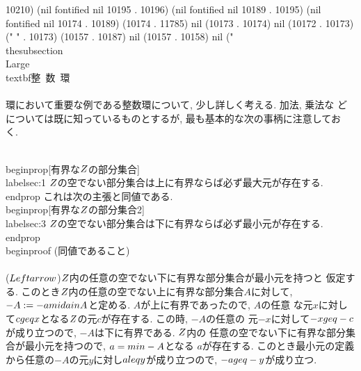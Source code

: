 10210) (nil fontified nil 10195 . 10196) (nil fontified nil 10189 . 10195) (nil fontified nil 10174 . 10189) (10174 . 11785) nil (10173 . 10174) nil (10172 . 10173) (" " . 10173) (10157 . 10187) nil (10157 . 10158) nil ("\\thesubsection{\\Large{\\textbf{整~数~環}}}\\\\
環において重要な例である整数環について, 少し詳しく考える. 加法, 乗法な
どについては既に知っているものとするが, 最も基本的な次の事柄に注意してお
く. 

\\begin{prop}[有界な$\\Z$の部分集合]
 \\label{sec:1}
 $\\Z$の空でない部分集合は上に有界ならば必ず最大元が存在する.
\\end{prop}
これは次の主張と同値である.
\\begin{prop}[有界な$\\Z$の部分集合2]
 \\label{sec:3}
 $\\Z$の空でない部分集合は下に有界ならば必ず最小元が存在する.
\\end{prop}
\\begin{proof}
 (同値であること)\\\\
 ($\\Leftarrow$)$\\Z$内の任意の空でない下に有界な部分集合が最小元を持つと
 仮定する. このとき$\\Z$内の任意の空でない上に有界な部分集合$A$に対して,
 $-A:=\\{-a\\mid a\\in A\\}$と定める. $A$が上に有界であったので, $A$の任意
 な元$x$に対して$c\\geq x$となる$\\Z$の元$c$が存在する. この時, $-A$の任意の
 元$-x$に対して$-x\\geq -c$が成り立つので, $-A$は下に有界である. $\\Z$内の
 任意の空でない下に有界な部分集合が最小元を持つので, $a=\\min -A$となる
 $a$が存在する. このとき最小元の定義から任意の$-A$の元$y$に対し$a\\leq y$が成り立つので, $-a\\geq -y$が成り立つ. 
